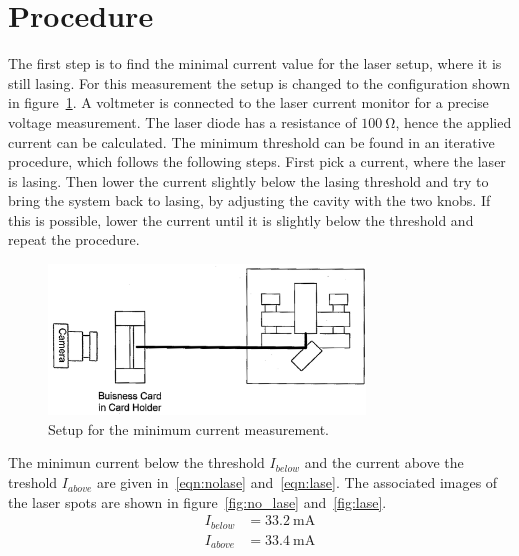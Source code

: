 \vspace{-20pt}
\section{Procedure}
\label{sec:Procedure}

The first step is to find the minimal current value for the laser setup, where
it is still lasing. For this measurement the setup is changed to the configuration shown in
figure~\ref{fig:setup_current}. A voltmeter is connected to the laser current
monitor for a precise voltage measurement. The laser diode has a resistance
of $\SI{100}{\ohm}$, hence the applied current can be calculated.
The minimum threshold can be found in an iterative procedure, which follows the following
steps. First pick a current, where the laser is lasing.
Then lower the current slightly below the lasing threshold and try to bring the system back to lasing,
by adjusting the cavity with the two knobs.
If this is possible, lower the current
until it is slightly below the threshold and repeat the procedure.

\begin{figure}
  \vspace{-10pt}
  \centering
  \includegraphics[width=0.75\textwidth]{Pics/setup_threshold.png}
  \caption{Setup for the minimum current measurement.\cite{anleitung}}
  \label{fig:setup_current}
\end{figure}

The minimun current below the threshold $I_{below}$ and the current above the treshold $I_{above}$
are given in~\eqref{eqn:nolase} and~\eqref{eqn:lase}.
The associated images of the laser spots are shown in figure~\ref{fig:no_lase}
and~\ref{fig:lase}.
\vspace{-10pt}
\begin{align}
  \label{eqn:nolase}
  I_{below} &= \SI{33.2}{\milli\ampere}\\
  \label{eqn:lase}
  I_{above} &= \SI{33.4}{\milli\ampere}
\end{align}


